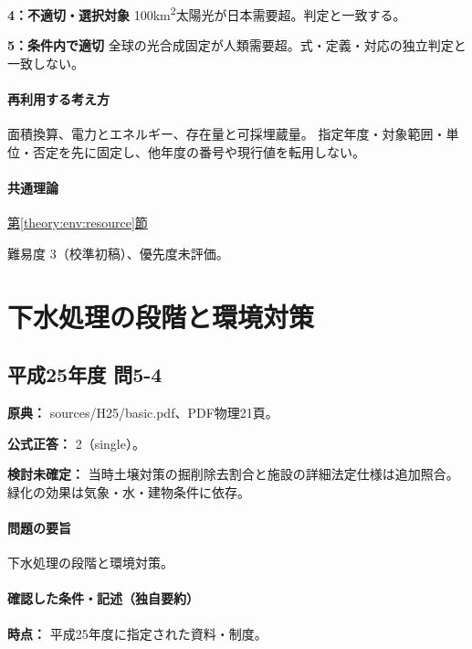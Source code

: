 \noindent\textbf{4：不適切・選択対象} 100km\textsuperscript{2}太陽光が日本需要超。判定と一致する。\par

\noindent\textbf{5：条件内で適切} 全球の光合成固定が人類需要超。式・定義・対応の独立判定と一致しない。\par

\paragraph{再利用する考え方} 面積換算、電力とエネルギー、存在量と可採埋蔵量。 指定年度・対象範囲・単位・否定を先に固定し、他年度の番号や現行値を転用しない。

\paragraph{共通理論} \hyperref[theory:env:resource]{第\ref*{theory:env:resource}節}

\par 難易度 3（校準初稿）、優先度未評価。

\section{下水処理の段階と環境対策}

\subsection{平成25年度 問5-4}
\label{q:h25-reg-basic-5-4}

\noindent\textbf{原典：} sources/H25/basic.pdf、PDF物理21頁。

\textbf{公式正答：} 2（single）。

\par\textbf{検討未確定：} 当時土壌対策の掘削除去割合と施設の詳細法定仕様は追加照合。緑化の効果は気象・水・建物条件に依存。

\paragraph{問題の要旨} 下水処理の段階と環境対策。

\paragraph{確認した条件・記述（独自要約）}\mbox{}\par

\noindent\textbf{時点：} 平成25年度に指定された資料・制度。\par

